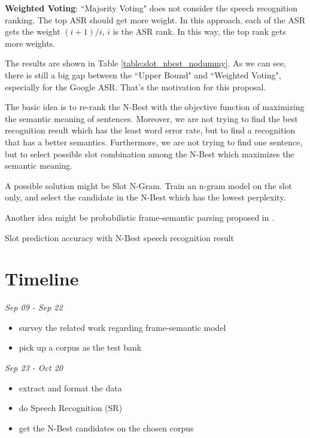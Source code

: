 \documentclass[11pt,letterpaper]{article}
\begin{document}
{\bf Weighted Voting}: 
``Majority Voting" does not consider the speech recognition ranking. The top ASR should get more weight. In this approach, each of the ASR gets the weight $(i+1)/i$, $i$ is the ASR rank. In this way, the top rank gets more weights.

The results are shown in Table \ref{table:slot_nbest_nodummy}. As we can see, there is still a big gap between the ``Upper Bound" and ``Weighted Voting", especially for the Google ASR. That's the motivation for this proposal.

The basic idea is to re-rank the N-Best with the objective function of maximizing the semantic meaning of sentences. Moreover, we are not trying to find the best recognition result which has the least word error rate, but to find a recognition that has a better semantics. Furthermore, we are not trying to find one sentence, but to select possible slot combination among the N-Best which maximizes the semantic meaning.

A possible solution might be Slot N-Gram. Train an n-gram model on the slot only, and select the candidate in the N-Best which has the lowest perplexity.

Another idea might be probabilistic frame-semantic parsing proposed in \cite{Das:2010}.

\begin{table*}[!htb] 
\centering 
 
\caption{Slot prediction accuracy with N-Best speech recognition result} 
\label{table:slot_nbest_nodummy} 
\end{table*} 

\section{Timeline}

\noindent \emph{Sep 09 - Sep 22}
\begin{itemize}
  \item survey the related work regarding frame-semantic model
  \item pick up a corpus as the test bank
\end{itemize}

\noindent \emph{Sep 23 -  Oct 20}
\begin{itemize}
  \item extract and format the data
  \item do Speech Recognition (SR)
  \item get the N-Best candidates on the chosen corpus
\end{itemize}
\end{document}
